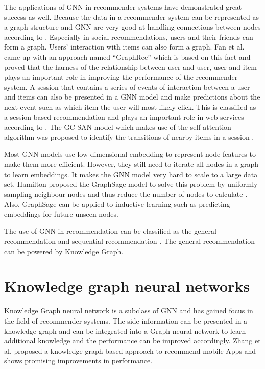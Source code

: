 \documentclass[11pt,twoside]{report}
\begin{document}
The applications of GNN in recommender systems have demonstrated great success as well. Because the data in a recommender system can be represented as a graph structure and GNN are very good at handling connections between nodes according to \cite{wu_graph_2020}. Especially in social recommendations, users and their friends can form a graph. Users’ interaction with items can also form a graph. Fan et al. came up with an approach named “GraphRec” which is based on this fact \cite{fan_graph_2019} and proved that the harness of the relationship between user and user, user and item plays an important role in improving the performance of the recommender system. A session that contains a series of events of interaction between a user and items can also be presented in a GNN model and make predictions about the next event such as which item the user will most likely click. This is classified as a session-based recommendation and plays an important role in web services according to \cite{xu_graph_2019}. The GC-SAN model which makes use of the self-attention algorithm was proposed to identify the transitions of nearby items in a session \cite{xu_graph_2019}.

Most GNN models use low dimensional embedding to represent node features to make them more efficient. However, they still need to iterate all nodes in a graph to learn embeddings. It makes the GNN model very hard to scale to a large data set. Hamilton \cite{hamilton_inductive_2018} proposed the GraphSage model to solve this problem by uniformly sampling neighbour nodes and thus reduce the number of nodes to calculate \cite{hamilton_inductive_2018}. Also, GraphSage can be applied to inductive learning such as predicting embeddings for future unseen nodes.

The use of GNN in recommendation can be classified as the general recommendation and sequential recommendation \cite{wu_graph_2020}. The general recommendation can be powered by Knowledge Graph.

\section{Knowledge graph neural networks}
Knowledge Graph neural network is a subclass of GNN and has gained focus in the field of recommender systems. The side information can be presented in a knowledge graph and can be integrated into a Graph neural network to learn additional knowledge and the performance can be improved accordingly. Zhang et al. \cite{zhang_knowledge_2020} proposed a knowledge graph based approach to recommend mobile Apps and shows promising improvements in performance.
\end{document}

